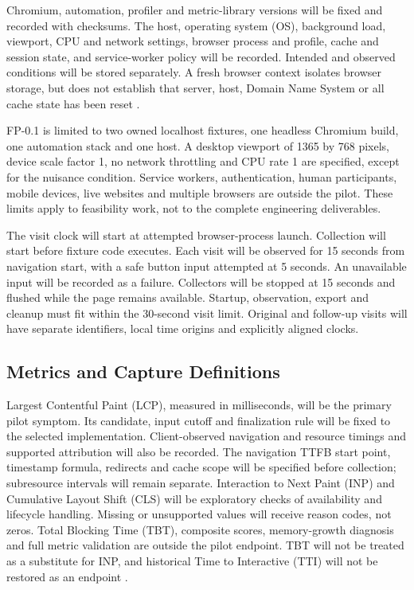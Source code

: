 Chromium, automation, profiler and metric-library versions will be fixed and recorded with checksums. The host, operating system (OS), background load, viewport, CPU and network settings, browser process and profile, cache and session state, and service-worker policy will be recorded. Intended and observed conditions will be stored separately. A fresh browser context isolates browser storage, but does not establish that server, host, Domain Name System or all cache state has been reset \parencite{SSS4NSXC,UKNA4QJZ,92RRK4LT}.

FP-0.1 is limited to two owned localhost fixtures, one headless Chromium build, one automation stack and one host. A desktop viewport of 1365 by 768 pixels, device scale factor 1, no network throttling and CPU rate 1 are specified, except for the nuisance condition. Service workers, authentication, human participants, mobile devices, live websites and multiple browsers are outside the pilot. These limits apply to feasibility work, not to the complete engineering deliverables.

The visit clock will start at attempted browser-process launch. Collection will start before fixture code executes. Each visit will be observed for 15 seconds from navigation start, with a safe button input attempted at 5 seconds. An unavailable input will be recorded as a failure. Collectors will be stopped at 15 seconds and flushed while the page remains available. Startup, observation, export and cleanup must fit within the 30-second visit limit. Original and follow-up visits will have separate identifiers, local time origins and explicitly aligned clocks.

\subsection{Metrics and Capture Definitions}

Largest Contentful Paint (LCP), measured in milliseconds, will be the primary pilot symptom. Its candidate, input cutoff and finalization rule will be fixed to the selected implementation. Client-observed navigation and resource timings and supported attribution will also be recorded. The navigation TTFB start point, timestamp formula, redirects and cache scope will be specified before collection; subresource intervals will remain separate. Interaction to Next Paint (INP) and Cumulative Layout Shift (CLS) will be exploratory checks of availability and lifecycle handling. Missing or unsupported values will receive reason codes, not zeros. Total Blocking Time (TBT), composite scores, memory-growth diagnosis and full metric validation are outside the pilot endpoint. TBT will not be treated as a substitute for INP, and historical Time to Interactive (TTI) will not be restored as an endpoint \parencite{QF52VUCU,QHUCFVBF,9T8ACIJ8,N33VTKAN,JJWRMF5Z,NXHCE5SV}.

